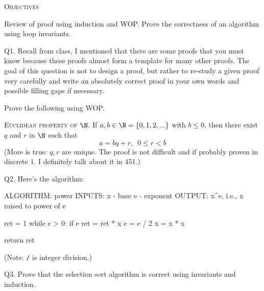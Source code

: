 


\renewcommand\TITLE{Assignment 3}


\topmatter

\textsc{Objectives}
\begin{itemize}
  \li Review of proof using induction and WOP. 
  \li Prove the correctness of an algorithm using loop invariants.
\end{itemize}


\newpage
Q1.
Recall from class, I mentioned that there are some proofs
that you must know because these proofs almost form a template for many other
proofs.
The goal of this question is not to design a proof,
but rather to re-study a given proof very carefully and write an absolutely
correct proof in your own words and possible filling gaps if necessary.

Prove the following using WOP.

\textsc{Euclidean property of $\N$.}
If $a, b \in \N = \{0, 1, 2, ...\}$ with $b \leq 0$,
then there exist $q$ and $r$ in $\N$ such that
\[
a = bq + r, \,\,\, 0 \leq r < b
\]
(More is true: $q,r$ are unique. The proof is not difficult
and if probably proven in discrete 1. I definitely talk about it in 451.)

\SOLUTION



\newpage
Q2.
Here's the algorithm:
\begin{console}
ALGORITHM: power
INPUTS: x - base
        e - exponent
OUTPUT: x^e, i.e., x raised to power of e

ret = 1
while e > 0:
    if e %
        ret = ret * x
    e = e / 2
    x = x * x
    
return ret
\end{console}
(Note: \texttt{/} is integer division.)

\SOLUTION



\newpage
Q3.
Prove that the selection sort algorithm is correct using invariants
and induction.

\SOLUTION





